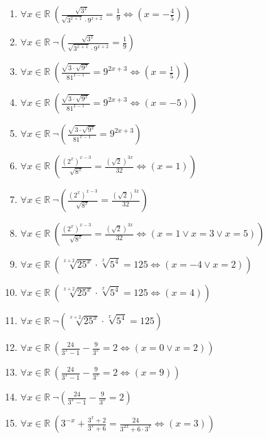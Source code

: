 \documentclass[11pt,a4paper]{article}
\begin{document}
\begin{enumerate}
\item $\displaystyle \forall x \in \mathbb{R}\ \left( \frac{\sqrt{3^{x}}}{\sqrt{3^{x+1}} \cdot 9^{x+2}} = \frac{1}{9} \iff \left( x = -\frac{4}{5} \right) \right)$
\item $\displaystyle \forall x \in \mathbb{R}\ \lnot \left( \frac{\sqrt{3^{x}}}{\sqrt{3^{x+1}} \cdot 9^{x+2}} = \frac{1}{9} \right)$
\item $\displaystyle \forall x \in \mathbb{R}\ \left( \frac{\sqrt{3 \cdot \sqrt{9^{x}}}}{81^{x-1}} = 9^{2x+3} \iff \left( x = \frac{1}{5} \right) \right)$
\item $\displaystyle \forall x \in \mathbb{R}\ \left( \frac{\sqrt{3 \cdot \sqrt{9^{x}}}}{81^{x-1}} = 9^{2x+3} \iff \left( x = -5 \right) \right)$
\item $\displaystyle \forall x \in \mathbb{R}\ \lnot \left( \frac{\sqrt{3 \cdot \sqrt{9^{x}}}}{81^{x-1}} = 9^{2x+3} \right)$
\item $\displaystyle \forall x \in \mathbb{R}\ \left( \frac{(2^{x})^{x-3}}{\sqrt{8^{x}}} = \frac{(\sqrt{2})^{3x}}{32} \iff \left( x = 1 \right) \right)$
\item $\displaystyle \forall x \in \mathbb{R}\ \lnot \left( \frac{(2^{x})^{x-3}}{\sqrt{8^{x}}} = \frac{(\sqrt{2})^{3x}}{32} \right)$
\item $\displaystyle \forall x \in \mathbb{R}\ \left( \frac{(2^{x})^{x-3}}{\sqrt{8^{x}}} = \frac{(\sqrt{2})^{3x}}{32} \iff \left( x = 1 \lor x = 3 \lor x = 5 \right) \right)$
\item $\displaystyle \forall x \in \mathbb{R}\ \left( \sqrt[x+2]{25^{x}} \cdot \sqrt[x]{5^{4}} = 125 \iff \left( x = -4 \lor x = 2 \right) \right)$
\item $\displaystyle \forall x \in \mathbb{R}\ \left( \sqrt[x+2]{25^{x}} \cdot \sqrt[x]{5^{4}} = 125 \iff \left( x = 4 \right) \right)$
\item $\displaystyle \forall x \in \mathbb{R}\ \lnot \left( \sqrt[x+2]{25^{x}} \cdot \sqrt[x]{5^{4}} = 125 \right)$
\item $\displaystyle \forall x \in \mathbb{R}\ \left( \frac{24}{3^{x} - 1} - \frac{9}{3^{x}} = 2 \iff \left( x = 0 \lor x = 2 \right) \right)$
\item $\displaystyle \forall x \in \mathbb{R}\ \left( \frac{24}{3^{x} - 1} - \frac{9}{3^{x}} = 2 \iff \left( x = 9 \right) \right)$
\item $\displaystyle \forall x \in \mathbb{R}\ \lnot \left( \frac{24}{3^{x} - 1} - \frac{9}{3^{x}} = 2 \right)$
\item $\displaystyle \forall x \in \mathbb{R}\ \left( 3^{-x} + \frac{3^{x} + 2}{3^{x} + 6} = \frac{24}{3^{2x} + 6 \cdot 3^{x}} \iff \left( x = 3 \right) \right)$

\end{enumerate}
\end{document}
